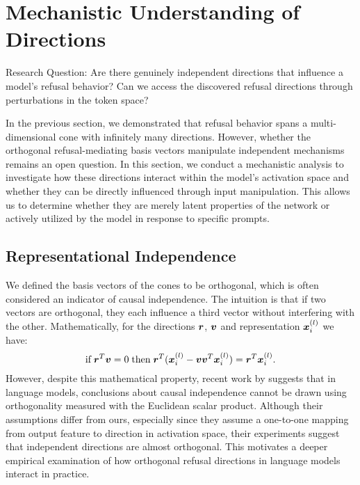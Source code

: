 \section{Mechanistic Understanding of Directions}\label{sec:mech_understanding}
\begin{graybox}
    Research Question: Are there genuinely independent directions that influence a model's refusal behavior? Can we access the discovered refusal directions through perturbations in the token space?
\end{graybox}

In the previous section, we demonstrated that refusal behavior spans a multi-dimensional cone with infinitely many directions. However, whether the orthogonal refusal-mediating basis vectors manipulate independent mechanisms remains an open question. In this section, we conduct a mechanistic analysis to investigate how these directions interact within the model’s activation space and whether they can be directly influenced through input manipulation. This allows us to determine whether they are merely latent properties of the network or actively utilized by the model in response to specific prompts.


\subsection{Representational Independence}\label{sec:repind}
We defined the basis vectors of the cones to be orthogonal, which is often considered an indicator of causal independence. The intuition is that if two vectors are orthogonal, they each influence a third vector without interfering with the other. Mathematically, for the directions ${{\bm{r}}}$, ${{\bm{v}}}$ and representation ${\bm{x}}_i^{(l)}$ we have:
\begin{equation*}
    \text{if}\; {{\bm{r}}}^T{{\bm{v}}} = 0\; \text{then}\; {{\bm{r}}}^T({\bm{x}}_i^{(l)} - {{\bm{v}}}{{\bm{v}}}^T{\bm{x}}_i^{(l)}) = {{\bm{r}}}^T{\bm{x}}_i^{(l)}.
\end{equation*}
However, despite this mathematical property, recent work by \citet{park_linear_2024} suggests that in language models, conclusions about causal independence cannot be drawn using orthogonality measured with the Euclidean scalar product. Although their assumptions differ from ours, especially since they assume a one-to-one mapping from output feature to direction in activation space, their experiments suggest that independent directions are almost orthogonal. This motivates a deeper empirical examination of how orthogonal refusal directions in language models interact in practice.

